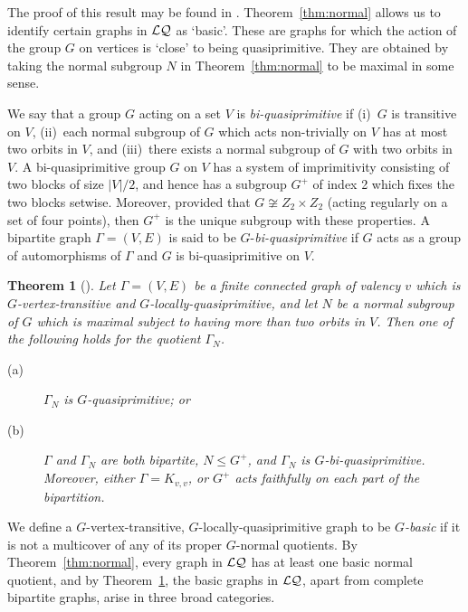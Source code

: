 \documentclass[12pt, a4paper]{article}
\newtheorem{theorem}{Theorem}[section]
\def\FB{{\cal LQ}}
\def\Ga{\Gamma}
\begin{document}
The proof of this result may be found in \cite[Lemmas~1.1, 1.4(p), 
1.5 and 1.6]{cep:p1}. 
Theorem~\ref{thm:normal} allows us to identify certain
graphs in $\FB$ as `basic'.
These are  graphs for which the action of the group $G$ on vertices is
`close' to being quasiprimitive. 
They are obtained by taking the normal subgroup $N$ in 
Theorem~\ref{thm:normal} to be maximal in some sense.

We say that a group $G$ acting on a set $V$ is \emph{bi-quasiprimitive} if
(i)\ $G$ is transitive on $V$, (ii)\ each normal subgroup of $G$ which 
acts non-trivially on $V$ has at most two orbits in $V$, and (iii)\
there exists a normal subgroup of $G$ with two orbits in $V$.
A bi-quasiprimitive group $G$ on $V$ has a  system of imprimitivity
consisting of two blocks of size $|V|/2$, and hence has a subgroup $G^+$
of index 2 which fixes the two blocks setwise. 
Moreover, provided that $G\not\cong Z_2\times Z_2$ (acting regularly
on a set of four points), then $G^+$ is the unique subgroup 
with these properties.
A bipartite graph $\Ga=(V,E)$ is said to be $G$-\emph{bi-quasiprimitive} if $G$ acts
as a group of automorphisms of $\Ga$ and $G$ is bi-quasiprimitive on $V$.

\begin{theorem}[\cite{lpvz}]
\label{thm:basic}
Let $\Ga=(V,E)$ be a finite connected graph of valency $v$ which is 
$G$-vertex-transitive and $G$-locally-quasiprimitive, and let $N$ be a normal 
subgroup of $G$ which is maximal subject to having more than 
two orbits in $V$. Then one of the following holds for the quotient
$\Ga_N$.
\begin{description}
\item [(a)] $\Ga_N$ is $G$-quasiprimitive; or
\item [(b)] $\Ga$ and $\Ga_N$ are both bipartite, $N\le G^+$, and 
$\Ga_N$ is $G$-bi-quasiprimitive. Moreover, either $\Ga=K_{v,v}$,
or $G^+$ acts faithfully on each part of the bipartition.
\end{description}
\end{theorem}

We define a $G$-vertex-transitive, $G$-locally-quasiprimitive graph 
  to be \emph{$G$-basic} if it is not a
 multicover of any of its proper $G$-normal quotients. By 
 Theorem~\ref{thm:normal}, every graph in $\FB$ has at least one 
 basic
 normal quotient, and by Theorem~\ref{thm:basic}, the basic graphs in 
 $\FB$, apart from complete bipartite graphs, 
 arise in three broad categories.
 
\end{document}
